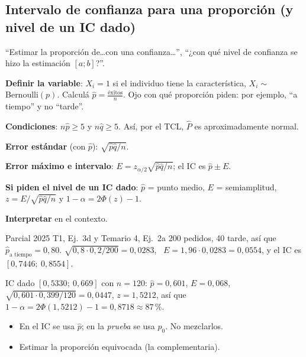 \subsection{Intervalo de confianza para una proporción (y nivel de un IC dado)}\label{p:icp}
\begin{cuando}
``Estimar la proporción de\ldots con una confianza\ldots'', ``¿con qué nivel de confianza se hizo la estimación $[a;b]$?''.
\end{cuando}
\begin{pasos}
\begin{pasolista}
\item \textbf{Definir la variable}: $X_i=1$ si el individuo tiene la característica, $X_i\sim$ Bernoulli$(p)$. Calculá $\hat p=\frac{\text{éxitos}}{n}$. Ojo con qué proporción piden: por ejemplo, ``a tiempo'' y no ``tarde''.
\item \textbf{Condiciones}: $n\hat p\ge5$ y $n\hat q\ge5$. Así, por el TCL, $\hat P$ es aproximadamente normal.
\item \textbf{Error estándar} (con $\hat p$): $\sqrt{\hat p\hat q/n}$.
\item \textbf{Error máximo e intervalo}: $E=z_{\alpha/2}\sqrt{\hat p\hat q/n}$; el IC es $\hat p\pm E$.
\item \textbf{Si piden el nivel de un IC dado}: $\hat p$ = punto medio, $E$ = semiamplitud, $z=E\big/\sqrt{\hat p\hat q/n}$ y $1-\alpha=2\Phi(z)-1$.
\item \textbf{Interpretar} en el contexto.
\end{pasolista}
\end{pasos}
\begin{modelo}{Parcial 2025 T1, Ej.\ 3d y Temario 4, Ej.\ 2a}
200 pedidos, 40 tarde, así que $\hat p_{\text{a tiempo}}=0{,}80$. $\sqrt{0{,}8\cdot0{,}2/200}=0{,}0283$, \ $E=1{,}96\cdot0{,}0283=0{,}0554$, y el IC es $[0{,}7446;\ 0{,}8554]$.

IC dado $[0{,}5330;\ 0{,}669]$ con $n=120$: $\hat p=0{,}601$, $E=0{,}068$, $\sqrt{0{,}601\cdot0{,}399/120}=0{,}0447$, $z=1{,}5212$, así que $1-\alpha=2\Phi(1{,}5212)-1=0{,}8718\approx87\,\%$.
\end{modelo}
\begin{ojo}
\begin{itemize}
\item En el IC se usa $\hat p$; en la \emph{prueba} se usa $p_0$. No mezclarlos.
\item Estimar la proporción equivocada (la complementaria).
\end{itemize}
\end{ojo}

